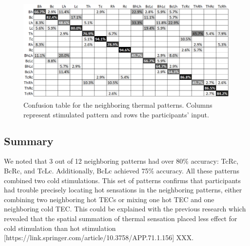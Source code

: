 \documentclass[preprint,12pt]{elsarticle}
\begin{document}
\begin{figure}[tp]
  \centering
  \includegraphics[width=0.9\columnwidth]{img/fig11.png}
  \caption{Confusion table for the neighboring thermal patterns. Columns represent stimulated pattern and rows the participants' input.}
  \label{fig:11}
\end{figure}

\subsection{Summary}
We noted that 3 out of 12 neighboring patterns had over 80\% accuracy: TcRc, BcRc, and TcLc. Additionally, BcLc achieved 75\% accuracy. All these patterns combined two cold stimulations. This set of patterns confirms that participants had trouble precisely locating hot sensations in the neighboring patterns, either combining two neighboring hot TECs or mixing one hot TEC and one neighboring cold TEC. This could be explained with the previous research which revealed that the spatial summation of thermal sensation placed less effect for cold stimulation than hot stimulation [https://link.springer.com/article/10.3758/APP.71.1.156] XXX. 



\end{document}
